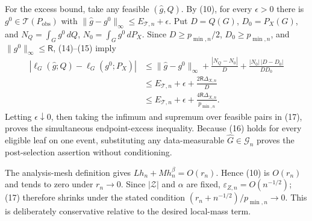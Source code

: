 For the excess bound, take any feasible \((\widehat g,Q)\).  By (10), for every \(\epsilon>0\) there is \(g^0\in\mathcal T(P_{\mathrm{obs}})\) with \(\|\widehat g-g^0\|_\infty\leq E_{\mathcal T,n}+\epsilon\).  Put \(D=Q(G)\), \(D_0=P_X(G)\), and \(N_Q=\int_Gg^0\,dQ\), \(N_0=\int_Gg^0\,dP_X\).  Since \(D\geq p_{\min,n}/2\), \(D_0\geq p_{\min,n}\), and \(\|g^0\|_\infty\leq\mathsf R\), (14)--(15) imply
\[
\begin{aligned}
|\ell_G(\widehat g;Q)-\ell_G(g^0;P_X)|
&\leq\|\widehat g-g^0\|_\infty
+\frac{|N_Q-N_0|}{D}
+\frac{|N_0|\,|D-D_0|}{DD_0}\\
&\leq E_{\mathcal T,n}+\epsilon
+\frac{2\mathsf R\Delta_{X,n}}{D}\\
&\leq E_{\mathcal T,n}+\epsilon
+\frac{4\mathsf R\Delta_{X,n}}{p_{\min,n}}.
\end{aligned}
\tag{17}
\]
Letting \(\epsilon\downarrow0\), then taking the infimum and supremum over feasible pairs in (17), proves the simultaneous endpoint-excess inequality.  Because (16) holds for every eligible leaf on one event, substituting any data-measurable \(\widehat G\in\mathcal G_n\) proves the post-selection assertion without conditioning.

The analysis-mesh definition gives \(Lh_n+Mh_n^\beta=O(r_n)\).  Hence (10) is \(O(r_n)\) and tends to zero under \(r_n\to0\).  Since \(|\mathcal Z|\) and \(\alpha\) are fixed, \(\varepsilon_{Z,n}=O(n^{-1/2})\); (17) therefore shrinks under the stated condition \((r_n+n^{-1/2})/p_{\min,n}\to0\).  This is deliberately conservative relative to the desired local-mass term.

